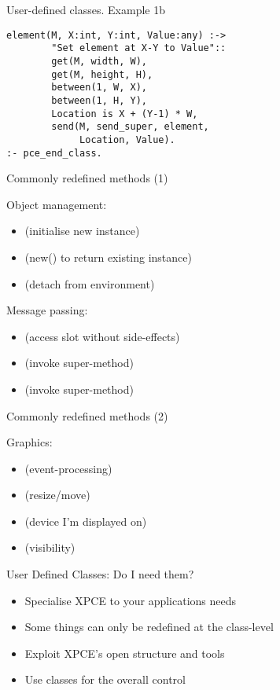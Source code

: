 \begin{sli}{User-defined classes. Example 1b}

\begin{verbatim}
element(M, X:int, Y:int, Value:any) :->
        "Set element at X-Y to Value"::
        get(M, width, W),
        get(M, height, H),
        between(1, W, X),
        between(1, H, Y),
        Location is X + (Y-1) * W,
        send(M, send_super, element,
             Location, Value).
:- pce_end_class.
\end{verbatim}

\noindent
\end{sli}

\begin{sli}{Commonly redefined methods (1)}

Object management:

\begin{itemize}
    \item {} (initialise new instance)
    \item {} (new() to return existing instance)
    \item {} (detach from environment)
\end{itemize}

Message passing:

\begin{itemize}
    \item {} (access slot without side-effects)
    \item {} (invoke super-method)
    \item {} (invoke super-method)
\end{itemize}
\end{sli}

\begin{sli}{Commonly redefined methods (2)}

Graphics:

\begin{itemize}
    \item {} (event-processing)
    \item {} (resize/move)
    \item {} (device I'm displayed on)
    \item {} (visibility)
\end{itemize}
\end{sli}


\begin{sli}{User Defined Classes: Do I need them?}

\begin{itemize}
    \item Specialise XPCE to your applications needs
    \item Some things can only be redefined at the class-level
    \item Exploit XPCE's open structure and tools
    \item Use classes for the overall control
\end{itemize}
\end{sli}

